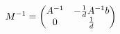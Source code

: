 \documentclass[preview]{standalone}
\begin{document}
\begin{align*}
\special{dvisvgm:raw <g id='unique000'>}M^{-1}=\begin{pmatrix}A^{-1}&-\frac{1}{d}A^{-1}b\\0&\frac{1}{d}\end{pmatrix}\special{dvisvgm:raw </g>}
\end{align*}
\end{document}
